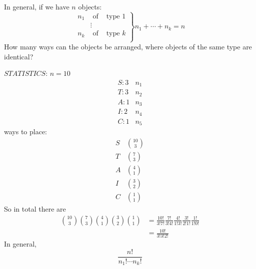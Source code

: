 In general, if we have $ n $ objects:
\[
\left.
\begin{array}{ccc}
    n_1&\text{ of } & \text{type $1$}\\
    &\vdots\\
    n_k&\text{ of } & \text{type $k$}\\
\end{array}
\right\}n_1+\cdots +n_k=n
\]
How many ways can the objects be arranged, where objects
of the same type are identical?

$STATISTICS$: $ n=10 $
\[
\begin{array}{cc}
    S:3& n_1\\
    T:3& n_2\\
    A:1& n_3\\
    I:2& n_4\\
    C:1& n_5
\end{array}
\]
ways to place:
\[
\begin{array}{cc}
    S& \binom{10}{3}\\
    T& \binom{7}{3}\\
    A& \binom{4}{1}\\
    I& \binom{3}{2}\\
    C& \binom{1}{1}
\end{array}
\]
So in total there are
\begin{align*}
    \binom{10}{3}\binom{7}{3}\binom{4}{1}\binom{3}{2}\binom{1}{1}&=
    \frac{10!}{3!7!}\frac{7!}{3!4!} \frac{4!}{1!3!} \frac{3!}{2!1!}\frac{1!}{1!0!}\\
    &=\frac{10!}{3!3!2!}  
\end{align*}
In general,
\[ \frac{n!}{n_1!\cdots n_k!} \]